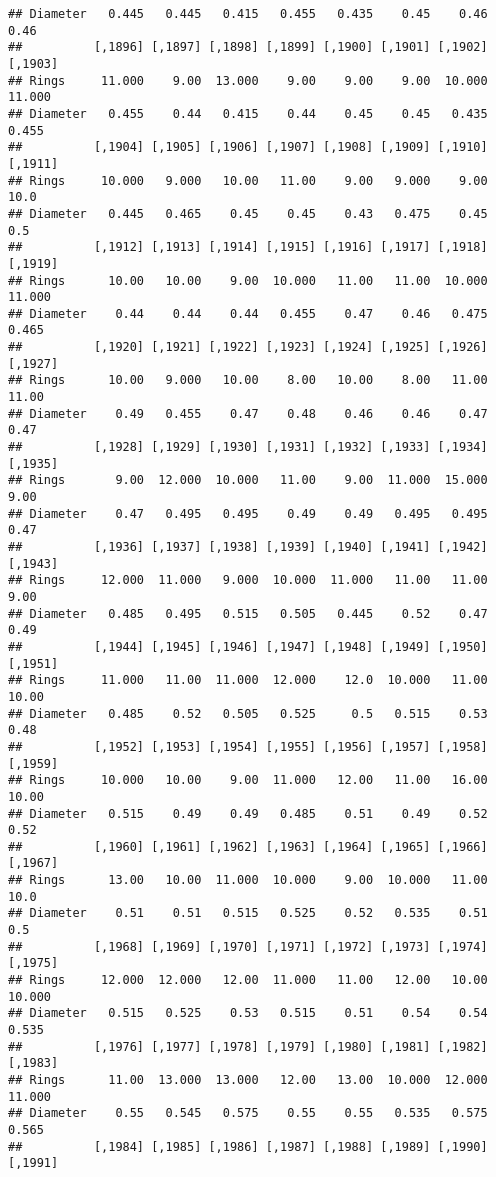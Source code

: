 \documentclass[
]{article}
\begin{document}
\begin{verbatim}
## Diameter   0.445   0.445   0.415   0.455   0.435    0.45    0.46    0.46
##          [,1896] [,1897] [,1898] [,1899] [,1900] [,1901] [,1902] [,1903]
## Rings     11.000    9.00  13.000    9.00    9.00    9.00  10.000  11.000
## Diameter   0.455    0.44   0.415    0.44    0.45    0.45   0.435   0.455
##          [,1904] [,1905] [,1906] [,1907] [,1908] [,1909] [,1910] [,1911]
## Rings     10.000   9.000   10.00   11.00    9.00   9.000    9.00    10.0
## Diameter   0.445   0.465    0.45    0.45    0.43   0.475    0.45     0.5
##          [,1912] [,1913] [,1914] [,1915] [,1916] [,1917] [,1918] [,1919]
## Rings      10.00   10.00    9.00  10.000   11.00   11.00  10.000  11.000
## Diameter    0.44    0.44    0.44   0.455    0.47    0.46   0.475   0.465
##          [,1920] [,1921] [,1922] [,1923] [,1924] [,1925] [,1926] [,1927]
## Rings      10.00   9.000   10.00    8.00   10.00    8.00   11.00   11.00
## Diameter    0.49   0.455    0.47    0.48    0.46    0.46    0.47    0.47
##          [,1928] [,1929] [,1930] [,1931] [,1932] [,1933] [,1934] [,1935]
## Rings       9.00  12.000  10.000   11.00    9.00  11.000  15.000    9.00
## Diameter    0.47   0.495   0.495    0.49    0.49   0.495   0.495    0.47
##          [,1936] [,1937] [,1938] [,1939] [,1940] [,1941] [,1942] [,1943]
## Rings     12.000  11.000   9.000  10.000  11.000   11.00   11.00    9.00
## Diameter   0.485   0.495   0.515   0.505   0.445    0.52    0.47    0.49
##          [,1944] [,1945] [,1946] [,1947] [,1948] [,1949] [,1950] [,1951]
## Rings     11.000   11.00  11.000  12.000    12.0  10.000   11.00   10.00
## Diameter   0.485    0.52   0.505   0.525     0.5   0.515    0.53    0.48
##          [,1952] [,1953] [,1954] [,1955] [,1956] [,1957] [,1958] [,1959]
## Rings     10.000   10.00    9.00  11.000   12.00   11.00   16.00   10.00
## Diameter   0.515    0.49    0.49   0.485    0.51    0.49    0.52    0.52
##          [,1960] [,1961] [,1962] [,1963] [,1964] [,1965] [,1966] [,1967]
## Rings      13.00   10.00  11.000  10.000    9.00  10.000   11.00    10.0
## Diameter    0.51    0.51   0.515   0.525    0.52   0.535    0.51     0.5
##          [,1968] [,1969] [,1970] [,1971] [,1972] [,1973] [,1974] [,1975]
## Rings     12.000  12.000   12.00  11.000   11.00   12.00   10.00  10.000
## Diameter   0.515   0.525    0.53   0.515    0.51    0.54    0.54   0.535
##          [,1976] [,1977] [,1978] [,1979] [,1980] [,1981] [,1982] [,1983]
## Rings      11.00  13.000  13.000   12.00   13.00  10.000  12.000  11.000
## Diameter    0.55   0.545   0.575    0.55    0.55   0.535   0.575   0.565
##          [,1984] [,1985] [,1986] [,1987] [,1988] [,1989] [,1990] [,1991]

\end{verbatim}
\end{document}
